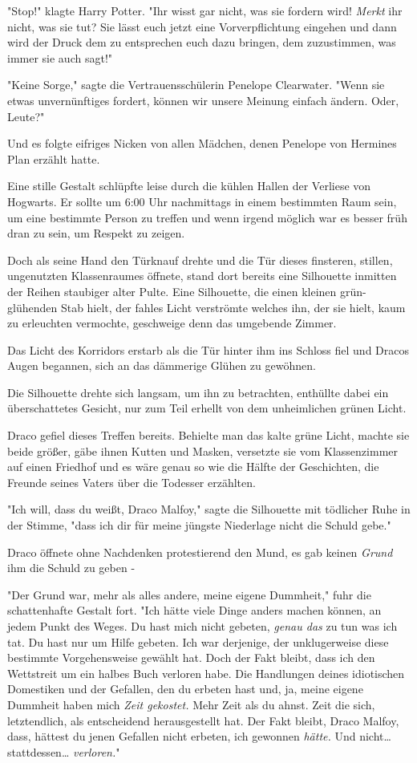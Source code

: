 {"Stop!" klagte Harry Potter. "Ihr wisst gar nicht, was sie fordern wird! \emph{Merkt} ihr nicht, was sie tut? Sie lässt euch jetzt eine Vorverpflichtung eingehen und dann wird der Druck dem zu entsprechen euch dazu bringen, dem zuzustimmen, was immer sie auch sagt!"

"Keine Sorge," sagte die Vertrauensschülerin Penelope Clearwater. "Wenn sie etwas unvernünftiges fordert, können wir unsere Meinung einfach ändern. Oder, Leute?"

Und es folgte eifriges Nicken von allen Mädchen, denen Penelope von Hermines Plan erzählt hatte.

\later

Eine stille Gestalt schlüpfte leise durch die kühlen Hallen der Verliese von Hogwarts. Er sollte um 6:00 Uhr nachmittags in einem bestimmten Raum sein, um eine bestimmte Person zu treffen und wenn irgend möglich war es besser früh dran zu sein, um Respekt zu zeigen.

Doch als seine Hand den Türknauf drehte und die Tür dieses finsteren, stillen, ungenutzten Klassenraumes öffnete, stand dort bereits eine Silhouette inmitten der Reihen staubiger alter Pulte. Eine Silhouette, die einen kleinen grün-glühenden Stab hielt, der fahles Licht verströmte welches ihn, der sie hielt, kaum zu erleuchten vermochte, geschweige denn das umgebende Zimmer.

Das Licht des Korridors erstarb als die Tür hinter ihm ins Schloss fiel und Dracos Augen begannen, sich an das dämmerige Glühen zu gewöhnen.

Die Silhouette drehte sich langsam, um ihn zu betrachten, enthüllte dabei ein überschattetes Gesicht, nur zum Teil erhellt von dem unheimlichen grünen Licht.

Draco gefiel dieses Treffen bereits. Behielte man das kalte grüne Licht, machte sie beide größer, gäbe ihnen Kutten und Masken, versetzte sie vom Klassenzimmer auf einen Friedhof und es wäre genau so wie die Hälfte der Geschichten, die Freunde seines Vaters über die Todesser erzählten.

"Ich will, dass du weißt, Draco Malfoy," sagte die Silhouette mit tödlicher Ruhe in der Stimme, "dass ich dir für meine jüngste Niederlage nicht die Schuld gebe."

Draco öffnete ohne Nachdenken protestierend den Mund, es gab keinen \emph{Grund} ihm die Schuld zu geben -

"Der Grund war, mehr als alles andere, meine eigene Dummheit," fuhr die schattenhafte Gestalt fort. "Ich hätte viele Dinge anders machen können, an jedem Punkt des Weges. Du hast mich nicht gebeten, \emph{genau das} zu tun was ich tat. Du hast nur um Hilfe gebeten. Ich war derjenige, der unklugerweise diese bestimmte Vorgehensweise gewählt hat. Doch der Fakt bleibt, dass ich den Wettstreit um ein halbes Buch verloren habe. Die Handlungen deines idiotischen Domestiken und der Gefallen, den du erbeten hast und, ja, meine eigene Dummheit haben mich \emph{Zeit gekostet.} Mehr Zeit als du ahnst. Zeit die sich, letztendlich, als entscheidend herausgestellt hat. Der Fakt bleibt, Draco Malfoy, dass, hättest du jenen Gefallen nicht erbeten, ich gewonnen \emph{hätte.} Und nicht… stattdessen… \emph{verloren.}"

}
